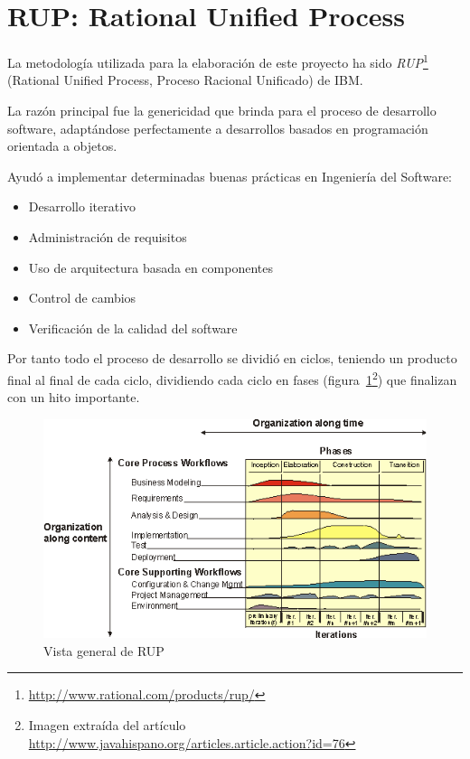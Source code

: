 
\section*{RUP: Rational Unified Process}

La metodología utilizada para la elaboración de este proyecto ha sido 
\emph{RUP}\footnote{\url{http://www.rational.com/products/rup/}}
(Rational Unified Process, Proceso Racional Unificado) de IBM.

La razón principal fue la genericidad que brinda para el proceso de desarrollo
software, adaptándose perfectamente a desarrollos basados en programación 
orientada a objetos.

Ayudó a implementar determinadas buenas prácticas en Ingeniería del Software:

\begin{itemize}
  \item Desarrollo iterativo
  \item Administración de requisitos
  \item Uso de arquitectura basada en componentes
  \item Control de cambios
  \item Verificación de la calidad del software
\end{itemize}

Por tanto todo el proceso de desarrollo se dividió en ciclos, teniendo un 
producto final al final de cada ciclo, dividiendo cada ciclo en fases
(figura~\ref{fig:RUP}\footnote{Imagen extraída del artículo
\url{http://www.javahispano.org/articles.article.action?id=76}}) que 
finalizan con un hito importante.

\begin{figure}[ht]
	\centering
	\includegraphics[width=12cm]{images/rup.png}
	\caption{Vista general de RUP}
	\label{fig:RUP}
\end{figure}

